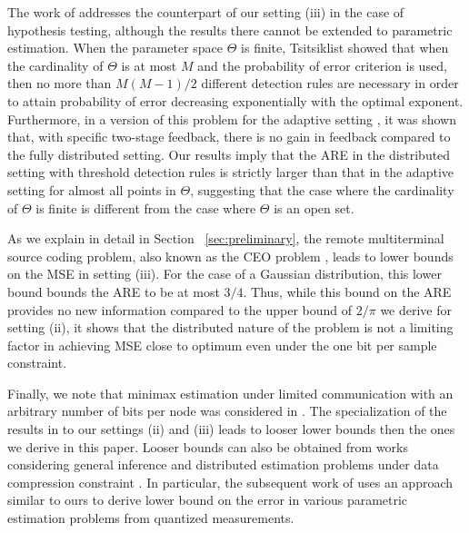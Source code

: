 \documentclass[letterpaper, 11pt]{IEEEtran}      %
\begin{document}
The work of \cite{52470} addresses the counterpart of our setting (iii) in the case of hypothesis testing, although the results there cannot be extended to parametric estimation. When the parameter space $\Theta$ is finite, Tsitsiklist \cite{tsitsiklis1988decentralized} showed that when the cardinality of $\Theta$ is at most $M$ and the probability of error criterion is used, then no more than $M(M-1)/2$ different detection rules are necessary in order to attain probability of error decreasing exponentially with the optimal exponent. %
Furthermore, in a version of this problem for the adaptive setting \cite{5751320}, it was shown that, with specific two-stage feedback, there is no gain in feedback compared to the fully distributed setting. Our results imply that the ARE in the distributed setting with threshold detection rules is strictly larger than that in the adaptive setting for almost all points in $\Theta$, suggesting that the case where the cardinality of $\Theta$ is finite is different from the case where $\Theta$ is an open set.\par
%
As we explain in detail in Section~ \ref{sec:preliminary}, the remote multiterminal source coding problem, also known as the CEO problem \cite{berger1996ceo, viswanathan1997quadratic, oohama1998rate, prabhakaran2004rate}, leads to lower bounds on the MSE in setting (iii). For the case of a Gaussian distribution, this lower bound bounds the ARE to be at most $3/4$. Thus, while this bound on the ARE provides no new information compared to the upper bound of $2/\pi$ we derive for setting (ii), it shows that the distributed nature of the problem is not a limiting factor in achieving MSE close to optimum even under the one bit per sample constraint. 
 \par
% 
Finally, we note that minimax estimation under limited communication with an arbitrary number of bits per node was considered in 
\cite{zhang2013information, duchi2014optimality}. The specialization of the results in \cite{zhang2013information, duchi2014optimality} to our settings (ii) and (iii) leads to looser lower bounds then the ones we derive in this paper. Looser bounds can also be obtained from works considering general inference and distributed estimation problems under data compression constraint \cite{DBLP:journals/corr/abs-1802-08417, zhang1988estimation, han2018distributed, xu2017information, Barnes2018}. In particular, the subsequent work of \cite{Barnes2018} uses an approach similar to ours to derive lower bound on the error in various parametric estimation problems from quantized measurements. \par
\end{document}
